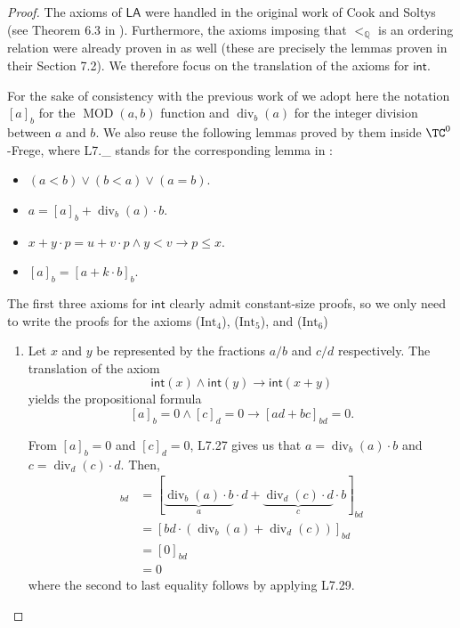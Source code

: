 \documentclass[11pt]{article}
\newcommand{\LA}{\mathsf{LA}}
\newcommand{\LAint}{\mathsf{int}}
\theoremstyle{definition}
\theoremstyle{plain}
\theoremstyle{remark}
\newcommand{\bQ}{\mathbb{Q}}
\begin{document}
\begin{proof}
    The axioms of $\LA$ were handled in the original work of Cook and Soltys (see Theorem 6.3 in \cite{cooksoltys}). Furthermore, the axioms imposing that $<_\bQ$ is an ordering relation were already proven in \cite{BPR1997} as well (these are precisely the lemmas proven in their Section 7.2). We therefore focus on the translation of the axioms for $\LAint$.
    
    For the sake of consistency with the previous work of \citeauthor{BPR1997} we adopt here the notation $[a]_b$ for the $\operatorname{MOD}(a,b)$ function and $\operatorname{div}_b(a)$ for the integer division between $a$ and $b$. We also reuse the following lemmas proved by them inside $\TC^0$-Frege, where L7.\_ stands for the corresponding lemma in \cite{BPR1997}:

    \begin{itemize}[leftmargin=1.3cm]
        \item[(L7.19)] $(a < b) \lor (b< a) \lor (a = b)$.
        \item[(L7.27)] $a = [a]_b + \operatorname{div}_b(a) \cdot b$.
        \item[(L7.28)] $ x+y\cdot p = u+ v \cdot p \land y < v \to p \leq x$.
        \item[(L7.29)] $[a]_b =[a + k\cdot b]_b$.

    \end{itemize}

    The first three axioms for $\LAint$ clearly admit constant-size proofs, so we only need to write the proofs for the axioms ($\text{Int}_4$), ($\text{Int}_5$), and ($\text{Int}_6$) 
    \begin{enumerate}[leftmargin=1.15cm]
            \item[($\text{Int}_4$)]
            
            Let $x$ and $y$ be represented by the fractions $a/b$ and $c/d$ respectively. The translation of the axiom
            \[ \LAint(x) \land \LAint(y) \to \LAint(x + y) \]
            yields the propositional formula
            \[ [a]_b = 0 \land [c]_d = 0 \to [ad + bc]_{bd} = 0\text{.} \] 

            From $[a]_b = 0$ and $[c]_d = 0$, L7.27 gives us that $a = \operatorname{div}_b(a)\cdot b$ and $c = \operatorname{div}_d(c)\cdot d$. Then,
                \begin{align*}
                    [ad + bc]_{bd} &= [{\underbrace{\operatorname{div}_b(a)\cdot b}_{a}}  \cdot d + {\underbrace{\operatorname{div}_d(c)\cdot d}_{c}}\cdot b]_{bd} \\
                    &=[bd \cdot (\operatorname{div}_b(a) + \operatorname{div}_d(c))]_{bd} \\
                    &= [0]_{bd} \\
                    &= 0
                \end{align*}
            where the second to last equality follows by applying L7.29.
            

\end{enumerate}
\end{proof}
\end{document}
